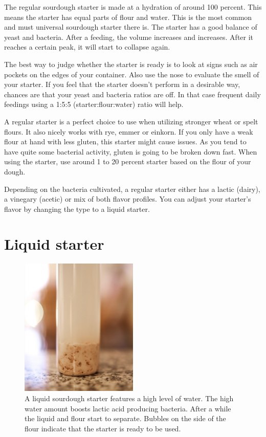 The regular sourdough starter is made at a hydration of around 100 percent.
This means the starter has equal parts of flour and water. This is the most
common and must universal sourdough starter there is. The starter has a good
balance of yeast and bacteria. After a feeding, the volume increases and
increases. After it reaches a certain peak, it will start to collapse again.

The best way to judge whether the starter is ready is to look at signs such as
air pockets on the edges of your container. Also use the nose to evaluate the
smell of your starter. If you feel that the starter doesn't perform in a
desirable way, chances are that your yeast and bacteria ratios are off. In that
case frequent daily feedings using a 1:5:5 (starter:flour:water) ratio will
help.

A regular starter is a perfect choice to use when utilizing stronger wheat or spelt flours.
It also nicely works with rye, emmer or einkorn. If you only have a weak flour
at hand with less gluten, this starter might cause issues. As you tend to have
quite some bacterial activity, gluten is going to be broken down fast. When
using the starter, use around 1 to 20 percent starter based on the flour of your
dough.

Depending on the bacteria cultivated, a regular starter either has a lactic (dairy),
a vinegary (acetic) or mix of both flavor profiles. You can adjust your
starter's flavor by changing the type to a liquid starter.

\section{Liquid starter}
\label{section:liquid-starter}

\begin{figure}[!htb]
  \centering
  \includegraphics[width=0.5\textwidth]{sourdough-starter-liquid.jpg}
  \caption{A liquid sourdough starter features a high level of water. The high
  water amount boosts lactic acid producing bacteria. After a while the liquid
  and flour start to separate. Bubbles on the side of the flour
  indicate that the starter is ready to be used.}
  \label{fig:liquid-sourdough-starter}
\end{figure}


